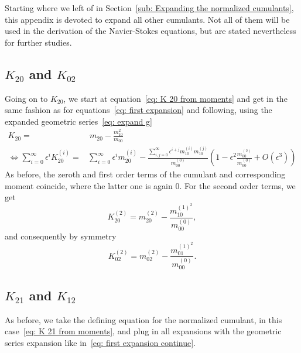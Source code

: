 Starting where we left of in Section~\eqref{sub: Expanding the normalized cumulants}, this appendix is devoted to expand all other cumulants.
Not all of them will be used in the derivation of the Navier-Stokes equations, but are stated nevertheless for further studies.

\subsection{\texorpdfstring{$K_{20}$}{K 20} and \texorpdfstring{$K_{02}$}{K 02}}
\label{sub: K 20}
Going on to $K_{20}$, we start at equation~\eqref{eq: K 20 from moments} and get in the same fashion as for equations~\eqref{eq: first expansion} and following, using the expanded geometric series~\eqref{eq: expand g}
\begin{equation}
  \begin{aligned}
    K_{20}  = &\ m_{20} - \frac{m_{10}^2}{m_{00}}\\
    \Leftrightarrow
    \sum_{i=0}^\infty \epsilon^i K_{20}^{(i)}
    =& \sum_{i=0}^\infty \epsilon^i m_{20}^{(i)}
    - \frac{\sum_{i,j=0}^\infty \epsilon^{i+j} m_{10}^{(i)}m_{10}^{(j)}}
        {m_{00}^{(0)}}
    \left(1 - \epsilon^2 \frac{m_{00}^{(2)}}{m_{00}^{(0)}}  + O(\epsilon^3)\right)
  \end{aligned}
\end{equation}
As before, the zeroth and first order terms of the cumulant and corresponding moment coincide, where the latter one is again $0$.
For the second order terms, we get
\begin{equation}
  K_{20}^{(2)} = m_{20}^{(2)} - \frac{ m_{10}^{{(1)}^2}}{m_{00}^{(0)}},
\end{equation}
and consequently by symmetry
\begin{equation}
  K_{02}^{(2)} = m_{02}^{(2)} - \frac{ m_{01}^{{(1)}^2}}{m_{00}^{(0)}}.
\end{equation}

\subsection{\texorpdfstring{$K_{21}$}{K 21} and \texorpdfstring{$K_{12}$}{K 12}}
\label{sub: K 21}
As before, we take the defining equation for the normalized cumulant, in this case~\eqref{eq: K 21 from moments}, and plug in all expansions with the geometric series expansion like in~\eqref{eq: first expansion continue}.

